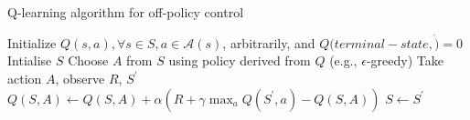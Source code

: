 \bgroup
\begin{frame}{Q-learning algorithm for off-policy control}
\begin{algorithmic}
\STATE Initialize $Q(s,a), \forall s \in S, a \in \mathcal{A}(s)$, arbitrarily, and $Q(terminal-state, \dot)=0$
\STATE Intialise $S$
\STATE Choose $A$ from $S$ using policy derived from $Q$ (e.g., $\epsilon$-greedy)
\STATE Take action $A$, observe $R$, $S^{\prime}$
\STATE $Q(S,A) \leftarrow Q(S,A) + \alpha (R + \gamma \max_{a}Q(S^{\prime}, a) - Q(S,A))$
\STATE $S \leftarrow S^{\prime}$
\ENDFOR
\ENDFOR
\end{algorithmic}
\end{frame}
\egroup